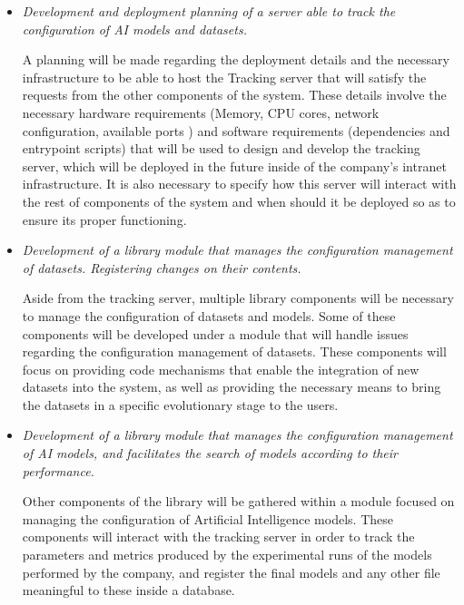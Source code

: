 \begin{itemize}
	\item \emph{Development and deployment planning of a server able to track the configuration of \acrshort{AI} models and datasets.}
	
	A planning will be made regarding the deployment details and the necessary infrastructure to be able to host the Tracking server that will satisfy the requests from the
	other components of the system. These details involve the necessary hardware requirements (Memory, CPU cores, network configuration, available ports ) and 
	software requirements (dependencies and entrypoint scripts) that will be used to design and develop the tracking server, which will be deployed in the future inside of the
	company's intranet infrastructure. It is also necessary to specify how this server will interact with the rest of components of the system and when should it be 
	deployed so as to ensure its proper functioning.

	\item \emph{Development of a library module that manages the configuration management of datasets. Registering changes on their contents.}
	
	Aside from the tracking server, multiple library components will be necessary to manage the configuration of datasets and models. Some of these components will be developed
	under a module that will handle issues regarding the configuration management of datasets. These components will focus on providing code mechanisms that enable the integration
	of new datasets into the system, as well as providing the necessary means to bring the datasets in a specific evolutionary stage to the users.

	\item \emph{Development of a library module that manages the configuration management of AI models, and facilitates the search of models according to their performance.}
	
	Other components of the library will be gathered within a module focused on managing the configuration of Artificial Intelligence models. These components will interact
	with the tracking server in order to track the parameters and metrics produced by the experimental runs of the models performed by the company, and register the final models
	and any other file meaningful to these inside a database.
\end{itemize}